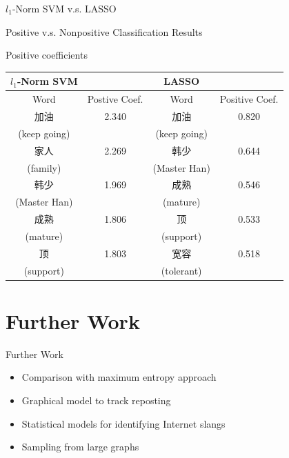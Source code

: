 \documentclass[12pt]{beamer}
\newcommand{\1}[1]{{\mathbf 1}\left\{#1\right\}}        %
\begin{document}
\begin{frame}{$l_1$-Norm SVM v.s. LASSO}

\begin{center}
Positive v.s. Nonpositive Classification Results

Positive coefficients
\end{center}

\footnotesize
\begin{center}
\begin{tabular}{|c|c||c|c|}
\hline
$l_1$-Norm SVM & & LASSO &  \\ \hline
Word & Postive Coef. & Word & Positive Coef.\\ \hline\hline
加油 & 2.340 & 加油 & 0.820\\
(keep going) & & (keep going) &\\\hline
家人 & 2.269 & 韩少 & 0.644\\
(family) & & (Master Han) &  \\\hline
韩少 & 1.969 & 成熟 & 0.546\\
(Master Han) & & (mature) &  \\\hline
成熟 & 1.806 & 顶 & 0.533\\
(mature) & & (support) &  \\\hline
顶 & 1.803 & 宽容 & 0.518\\
(support) & & (tolerant) &  \\\hline
\end{tabular}
\end{center}





\end{frame}

\section{Further Work}

\begin{frame}{Further Work}

\begin{itemize}[<+->]
\item Comparison with maximum entropy approach
\item Graphical model to track reposting
\item Statistical models for identifying Internet slangs
\item Sampling from large graphs
\end{itemize}

\end{frame}
\end{document}
